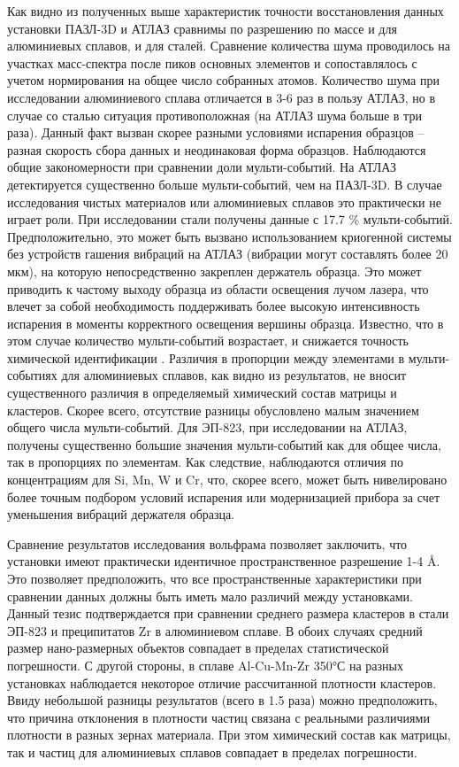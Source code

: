 Как видно из полученных выше характеристик точности восстановления данных установки ПАЗЛ-3D и АТЛАЗ сравнимы по разрешению по массе и для алюминиевых сплавов, и для сталей. Сравнение количества шума проводилось на участках масс-спектра после пиков основных элементов и сопоставлялось с учетом нормирования на общее число собранных атомов. Количество шума при исследовании алюминиевого сплава отличается в 3-6 раз в пользу АТЛАЗ, но в случае со сталью ситуация противоположная (на АТЛАЗ шума больше в три раза). Данный факт вызван скорее разными условиями испарения образцов – разная скорость сбора данных и неодинаковая форма образцов. Наблюдаются общие закономерности при сравнении доли мульти-событий. На АТЛАЗ детектируется существенно больше мульти-событий, чем на ПАЗЛ-3D. В случае исследования чистых материалов или алюминиевых сплавов это практически не играет роли. При исследовании стали получены данные с 17.7 \% мульти-событий. Предположительно, это может быть вызвано использованием криогенной системы без устройств гашения вибраций на АТЛАЗ (вибрации могут составлять более 20 мкм), на которую непосредственно закреплен держатель образца. Это может приводить к частому выходу образца из области освещения лучом лазера, что влечет за собой необходимость поддерживать более высокую интенсивность испарения в моменты корректного освещения вершины образца. Известно, что в этом случае количество мульти-событий возрастает, и снижается точность химической идентификации \cite{scbibOptParamsYAFI}. Различия в пропорции между элементами в мульти-событиях для алюминиевых сплавов, как видно из результатов, не вносит существенного различия в определяемый химический состав матрицы и кластеров. Скорее всего, отсутствие разницы обусловлено малым значением общего числа мульти-событий. Для ЭП-823, при исследовании на АТЛАЗ, получены существенно большие значения мульти-событий как для общее числа, так в пропорциях по элементам. Как следствие, наблюдаются отличия по концентрациям для Si, Mn, W и Cr, что, скорее всего, может быть нивелировано более точным подбором условий испарения или модернизацией прибора за счет уменьшения вибраций держателя образца.

Сравнение результатов исследования вольфрама позволяет заключить, что установки имеют практически идентичное пространственное разрешение 1-4 \r{A}. Это позволяет предположить, что все пространственные характеристики при сравнении данных должны быть иметь мало различий между установками. Данный тезис подтверждается при сравнении среднего размера кластеров в стали ЭП-823 и преципитатов Zr в алюминиевом сплаве. В обоих случаях средний размер нано-размерных объектов совпадает в пределах статистической погрешности. С другой стороны, в сплаве Al-Cu-Mn-Zr 350°С на разных установках наблюдается некоторое отличие рассчитанной плотности кластеров. Ввиду небольшой разницы результатов (всего в 1.5 раза) можно предположить, что причина отклонения в плотности частиц связана с реальными различиями плотности в разных зернах материала. При этом химический состав как матрицы, так и частиц для алюминиевых сплавов совпадает в пределах погрешности.

